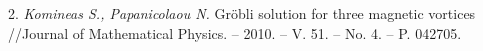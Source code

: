 2. {\it Komineas S., Papanicolaou N.}
 Gr\"{o}bli solution for three magnetic vortices //Journal of Mathematical Physics. -- 2010. -- V. 51. -- No. 4. -- P. 042705.
%
%



